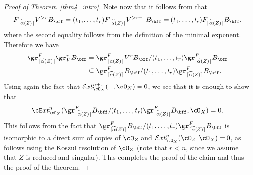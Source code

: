 \begin{proof}[Proof of Theorem~\ref{thm4_intro}]
Note now that it follows from \cite[Th.\,1.1]{CD} that\vspace*{-3pt}
\[F_{\lceil \widetilde{\alpha}(Z) \rceil} V^{>r}B_\bff = (t_1,\ldots,t_r)F_{\lceil \widetilde{\alpha}(Z)\rceil}V^{>r-1}B_{\bff}=
(t_1,\dots, t_r)F_{\lceil \widetilde{\alpha}(Z) \rceil} B_\bff,\]
where the second equality follows from the definition of the minimal exponent.
Therefore we have\vspace*{-3pt}
\[\begin{aligned} \gr^F_{\lceil \widetilde{\alpha}(Z) \rceil} \gr^r_V B_\bff&=\gr^F_{\lceil \widetilde{\alpha}(Z) \rceil}V^rB_{\bff}/(t_1,\ldots,t_r)\gr^F_{\lceil \widetilde{\alpha}(Z) \rceil}B_{\bff} \\
&\subseteq \gr^F_{\lceil \widetilde{\alpha}(Z) \rceil}B_\bff/(t_1,\dots, t_r) \gr^F_{\lceil \widetilde{\alpha}(Z) \rceil}B_\bff. \end{aligned}\]
Using again the fact that ${\mathcal Ext}^{n+1}_{\cO_X}(-,\cO_X)=0$, we see that it is enough to show that\vspace*{-3pt}
\[ \cE xt^n_{\cO_X}(\gr^F_{\lceil \widetilde{\alpha}(Z) \rceil}B_\bff/(t_1,\dots, t_r) \gr^F_{\lceil \widetilde{\alpha}(Z) \rceil}B_\bff,\cO_X) =0.\]
This follows from the fact that $\gr^F_{\lceil \widetilde{\alpha}(Z) \rceil}B_\bff/(t_1,\dots, t_r) \gr^F_{\lceil \widetilde{\alpha}(Z) \rceil}B_\bff$
is isomorphic to a direct sum of copies of $\cO_Z$ and ${\mathcal Ext}^n_{\cO_X}(\cO_Z,\cO_X)=0$, as follows using the
Koszul resolution of $\cO_Z$ (note that $r<n$, since we assume that $Z$ is reduced and singular). This completes the proof of the claim and thus
the proof of the theorem.
\end{proof}

